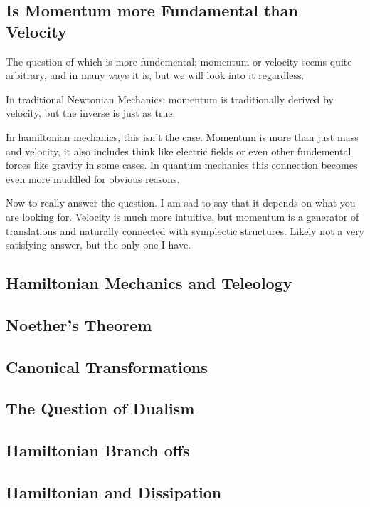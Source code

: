 \subsection{Is Momentum more Fundamental than Velocity}

The question of which is more fundemental; momentum or velocity seems quite arbitrary, and in many ways it is, but we will look into it regardless.

In traditional Newtonian Mechanics; momentum is traditionally derived by velocity, but the inverse is just as true.

In hamiltonian mechanics, this isn't the case. Momentum is more than just mass and velocity, it also includes think like electric fields or even other fundemental forces like gravity in some cases. In quantum mechanics this connection becomes even more muddled for obvious reasons.

Now to really answer the question. I am sad to say that it depends on what you are looking for. Velocity is much more intuitive, but momentum is a generator of translations and naturally connected with symplectic structures. Likely not a very satisfying answer, but the only one I have.


\subsection{Hamiltonian Mechanics and Teleology}


\subsection{Noether's Theorem}


\subsection{Canonical Transformations}

\subsection{The Question of Dualism}

\subsection{Hamiltonian Branch offs}

\subsection{Hamiltonian and Dissipation}

